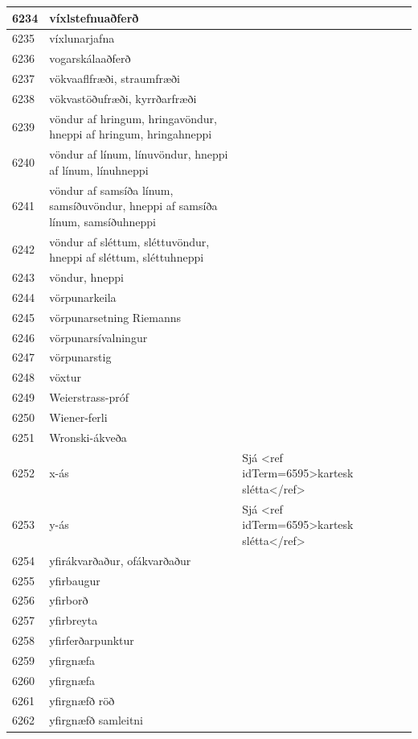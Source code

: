 \begin{longtable}{p{}|p{}|p{}|p{}|p{}}
\hline
6234 & víxlstefnuaðferð &  &  &  \\
\hline
6235 & víxlunarjafna &  &  &  \\
\hline
6236 & vogarskálaaðferð &  &  &  \\
\hline
6237 & vökvaaflfræði, straumfræði &  &  &  \\
\hline
6238 & vökvastöðufræði, kyrrðarfræði &  &  &  \\
\hline
6239 & vöndur af hringum, hringavöndur, hneppi af hringum, hringahneppi &  &  &  \\
\hline
6240 & vöndur af línum, línuvöndur, hneppi af línum, línuhneppi &  &  &  \\
\hline
6241 & vöndur af samsíða línum, samsíðuvöndur, hneppi af samsíða línum, samsíðuhneppi &  &  &  \\
\hline
6242 & vöndur af sléttum, sléttuvöndur, hneppi af sléttum, sléttuhneppi &  &  &  \\
\hline
6243 & vöndur, hneppi &  &  &  \\
\hline
6244 & vörpunarkeila &  &  &  \\
\hline
6245 & vörpunarsetning Riemanns &  &  &  \\
\hline
6246 & vörpunarsívalningur &  &  &  \\
\hline
6247 & vörpunarstig &  &  &  \\
\hline
6248 & vöxtur &  &  &  \\
\hline
6249 & Weierstrass-próf &  &  &  \\
\hline
6250 & Wiener-ferli &  &  &  \\
\hline
6251 & Wronski-ákveða &  &  &  \\
\hline
6252 & x-ás & Sjá <ref idTerm=6595>kartesk slétta</ref> &  & \\
\hline
6253 & y-ás &  Sjá <ref idTerm=6595>kartesk slétta</ref> &  & \\
\hline
6254 & yfirákvarðaður, ofákvarðaður &  &  &  \\
\hline
6255 & yfirbaugur &  &  &  \\
\hline
6256 & yfirborð &  &  &  \\
\hline
6257 & yfirbreyta &  &  &  \\
\hline
6258 & yfirferðarpunktur &  &  &  \\
\hline
6259 & yfirgnæfa &  &  &  \\
\hline
6260 & yfirgnæfa &  &  &  \\
\hline
6261 & yfirgnæfð röð &  &  &  \\
\hline
6262 & yfirgnæfð samleitni &  &  &  \\

\end{longtable}
